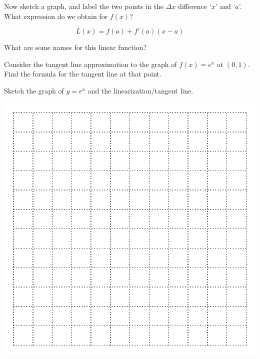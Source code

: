          Now sketch a graph, and label the two points
        in the $\Delta x$ difference `$x$' and `$a$'.  What expression
        do we obtain for $f(x)$?

        \vfill

\newpage
\begin{boxnote}
\[ L(x)=f(a) + f'(a) (x-a) 
\]
\end{boxnote}
\begin{problem}
 What are some names for this linear function?
\end{problem}


 \newpage
 \problem Consider the tangent line approximation to the graph of
 $f(x)=e^x$ at $(0,1)$.  Find the formula for the tangent line at that
 point.

\vfill
\begin{minipage}[t]{0.4\linewidth}
\vspace{0pt}
  Sketch the graph of $y = e^x$ and the linearization/tangent line.
\end{minipage}
\hfill
\begin{minipage}[t]{0.45\linewidth}
\vspace{0pt}
\includegraphics[width=0.9\linewidth]{graphics/empty_graph_square_12}
\end{minipage}


